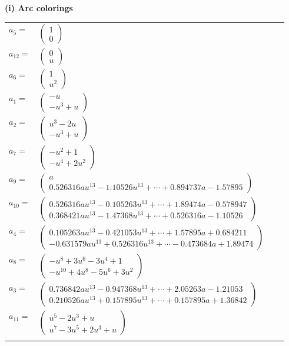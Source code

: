 \documentclass[1p]{elsarticle_modified}
\theoremstyle{definition}
\begin{document}
\flushleft \textbf{(i) Arc colorings}\\
\begin{tabular}{m{7pt} m{180pt} m{7pt} m{180pt} }
\flushright $a_{5}=$&$\begin{pmatrix}1\\0\end{pmatrix}$ \\
\flushright $a_{12}=$&$\begin{pmatrix}0\\u\end{pmatrix}$ \\
\flushright $a_{6}=$&$\begin{pmatrix}1\\u^2\end{pmatrix}$ \\
\flushright $a_{1}=$&$\begin{pmatrix}- u\\- u^3+u\end{pmatrix}$ \\
\flushright $a_{2}=$&$\begin{pmatrix}u^3-2 u\\- u^3+u\end{pmatrix}$ \\
\flushright $a_{7}=$&$\begin{pmatrix}- u^2+1\\- u^4+2 u^2\end{pmatrix}$ \\
\flushright $a_{9}=$&$\begin{pmatrix}a\\0.526316 a u^{13}-1.10526 u^{13}+\cdots+0.894737 a-1.57895\end{pmatrix}$ \\
\flushright $a_{10}=$&$\begin{pmatrix}0.526316 a u^{13}-0.105263 u^{13}+\cdots+1.89474 a-0.578947\\0.368421 a u^{13}-1.47368 u^{13}+\cdots+0.526316 a-1.10526\end{pmatrix}$ \\
\flushright $a_{4}=$&$\begin{pmatrix}0.105263 a u^{13}-0.421053 u^{13}+\cdots+1.57895 a+0.684211\\-0.631579 a u^{13}+0.526316 u^{13}+\cdots-0.473684 a+1.89474\end{pmatrix}$ \\
\flushright $a_{8}=$&$\begin{pmatrix}- u^8+3 u^6-3 u^4+1\\- u^{10}+4 u^8-5 u^6+3 u^2\end{pmatrix}$ \\
\flushright $a_{3}=$&$\begin{pmatrix}0.736842 a u^{13}-0.947368 u^{13}+\cdots+2.05263 a-1.21053\\0.210526 a u^{13}+0.157895 u^{13}+\cdots+0.157895 a+1.36842\end{pmatrix}$ \\
\flushright $a_{11}=$&$\begin{pmatrix}u^5-2 u^3+u\\u^7-3 u^5+2 u^3+u\end{pmatrix}$\\&\end{tabular}
\end{document}
